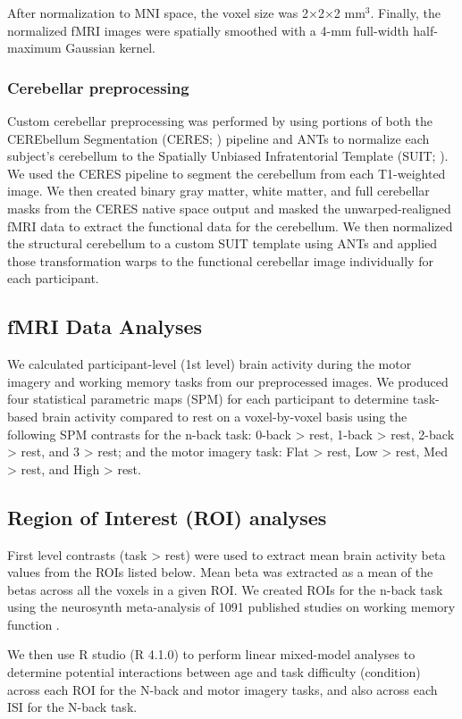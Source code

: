 \documentclass[a4paper,fleqn]{cas-sc}
\begin{document}
After normalization to MNI space, the voxel size was 2×2×2 mm$^3$. Finally, the normalized fMRI images were spatially smoothed with a 4-mm full-width half-maximum Gaussian kernel.

\subsubsection{Cerebellar preprocessing}
Custom cerebellar preprocessing was performed by using portions of both the CEREbellum Segmentation (CERES; \citealp{Romero2017}) pipeline and ANTs \citep{Avants2011} to normalize each subject's cerebellum to the Spatially Unbiased Infratentorial Template (SUIT; \citealp{Diedrichsen2006, Diedrichsen2009}). We used the CERES pipeline to segment the cerebellum from each T1-weighted image. We then created binary gray matter, white matter, and full cerebellar masks from the CERES native space output and masked the unwarped-realigned fMRI data to extract the functional data for the cerebellum. We then normalized the structural cerebellum to a custom SUIT template using ANTs \citep{Avants2011} and applied those transformation warps to the functional cerebellar image individually for each participant.

\subsection{fMRI Data Analyses}
We calculated participant-level (1st level) brain activity during the motor imagery and working memory tasks from our preprocessed images. We produced four statistical parametric maps (SPM) for each participant to determine task-based brain activity compared to rest on a voxel-by-voxel basis using the following SPM contrasts for the n-back task: 0-back > rest, 1-back > rest, 2-back > rest, and 3 > rest; and the motor imagery task: Flat > rest, Low > rest, Med > rest, and High > rest.

\subsection{Region of Interest (ROI) analyses}
First level contrasts (task > rest) were used to extract mean brain activity beta values from the ROIs listed below. Mean beta was extracted as a mean of the betas across all the voxels in a given ROI. We created ROIs for the n-back task using the neurosynth meta-analysis of 1091 published studies on working memory function \citep{Yarkoni2011}.

We then use R studio (R 4.1.0) to perform linear mixed-model analyses to determine potential interactions between age and task difficulty (condition) across each ROI for the N-back and motor imagery tasks, and also across each ISI for the N-back task.
\end{document}
